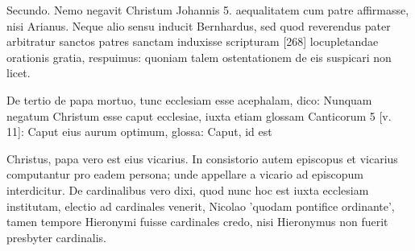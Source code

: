 Secundo. Nemo negavit Christum Johannis 5. aequalitatem cum patre affirmasse, nisi Arianus. Neque alio sensu inducit Bernhardus, sed quod reverendus pater arbitratur sanctos patres sanctam induxisse scripturam [268] locupletandae orationis gratia, respuimus: quoniam talem ostentationem de eis suspicari non licet.

De tertio de papa mortuo, tunc ecclesiam esse acephalam, dico: Nunquam negatum Christum esse caput ecclesiae, iuxta etiam glossam Canticorum 5 [v. 11]: Caput eius aurum optimum, glossa: Caput, id est

Christus, papa vero est eius vicarius. In consistorio autem episcopus et vicarius computantur pro eadem persona; unde appellare a vicario ad episcopum interdicitur. De cardinalibus vero dixi, quod nunc hoc est iuxta ecclesiam institutam, electio ad cardinales venerit, Nicolao 'quodam pontifice ordinante', tamen tempore Hieronymi fuisse cardinales credo, nisi Hieronymus non fuerit presbyter cardinalis.

